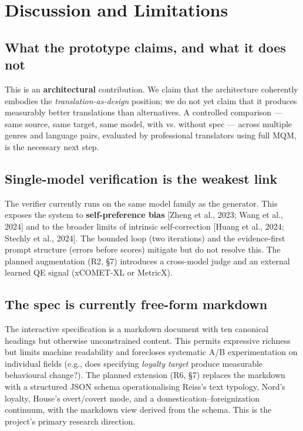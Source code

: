 \documentclass[11pt]{article}
\begin{document}
\section{Discussion and Limitations}

\subsection{What the prototype claims, and what it does not}

This is an \textbf{architectural} contribution. We claim that the architecture coherently embodies the \emph{translation-as-design} position; we do not yet claim that it produces measurably better translations than alternatives. A controlled comparison --- same source, same target, same model, with vs. without spec --- across multiple genres and language pairs, evaluated by professional translators using full MQM, is the necessary next step.

\subsection{Single-model verification is the weakest link}

The verifier currently runs on the same model family as the generator. This exposes the system to \textbf{self-preference bias} [Zheng et al., 2023; Wang et al., 2024] and to the broader limits of intrinsic self-correction [Huang et al., 2024; Stechly et al., 2024]. The bounded loop (two iterations) and the evidence-first prompt structure (errors before scores) mitigate but do not resolve this. The planned augmentation (R2, \S{}7) introduces a cross-model judge and an external learned QE signal (xCOMET-XL or MetricX).

\subsection{The spec is currently free-form markdown}

The interactive specification is a markdown document with ten canonical headings but otherwise unconstrained content. This permits expressive richness but limits machine readability and forecloses systematic A/B experimentation on individual fields (e.g., does specifying \emph{loyalty target} produce measurable behavioural change?). The planned extension (R6, \S{}7) replaces the markdown with a structured JSON schema operationalising Reiss's text typology, Nord's loyalty, House's overt/covert mode, and a domestication--foreignization continuum, with the markdown view derived from the schema. This is the project's primary research direction.
\end{document}
